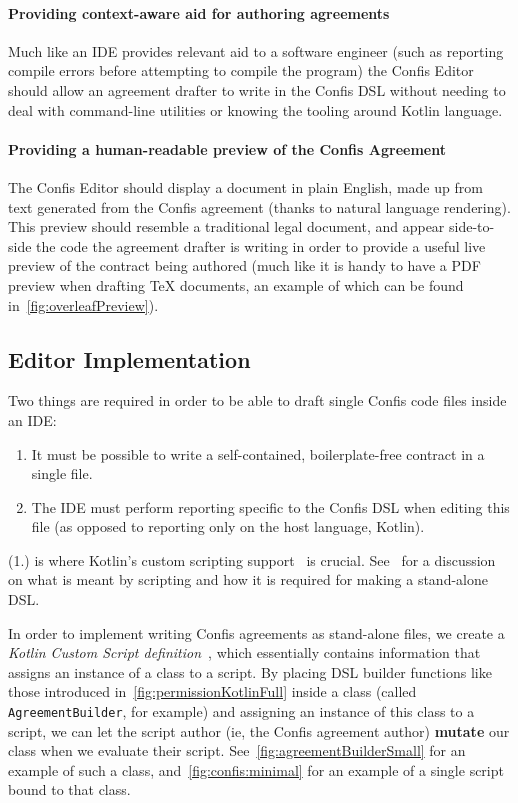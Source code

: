 \paragraph{Providing context-aware aid for authoring agreements} Much like an IDE provides relevant aid to a software engineer (such as reporting compile errors before attempting to compile the program) the Confis Editor should allow an agreement drafter to write in the Confis DSL without needing to deal with command-line utilities or knowing the tooling around Kotlin language.

\paragraph{Providing a human-readable preview of the Confis Agreement}

The Confis Editor should display a document in plain English, made up from text generated from the Confis agreement (thanks to natural language rendering).
This preview should resemble a traditional legal document, and appear side-to-side the code the agreement drafter is writing in order to provide a useful live preview of the contract being authored (much like it is handy to have a PDF preview when drafting TeX documents, an example of which can be found in~\autoref{fig:overleafPreview}).

\subsection{Editor Implementation}\label{subsec:editor-implementation}

Two things are required in order to be able to draft single Confis code files inside an IDE:
\begin{enumerate}
    \item It must be possible to write a self-contained, boilerplate-free contract in a single file.
    \item The IDE must perform reporting specific to the Confis DSL when editing this file (as opposed to reporting only on the host language, Kotlin).
\end{enumerate}

(1.) is where Kotlin's custom scripting support~\cite{kotlinScriptKeep} is crucial.
See~ for a discussion on what is meant by scripting and how it is required for making a stand-alone DSL.

In order to implement writing Confis agreements as stand-alone files, we create a \emph{Kotlin Custom Script definition}~\cite{kotlinScriptKeep}, which essentially contains information that assigns an instance of a class to a script.
By placing DSL builder functions like those introduced in~\autoref{fig:permissionKotlinFull} inside a class (called \texttt{AgreementBuilder}, for example) and assigning an instance of this class to a script, we can let the script author (ie, the Confis agreement author) \textbf{mutate} our class when we evaluate their script.
See~\autoref{fig:agreementBuilderSmall} for an example of such a class, and~\autoref{fig:confis:minimal} for an example of a single script bound to that class.

